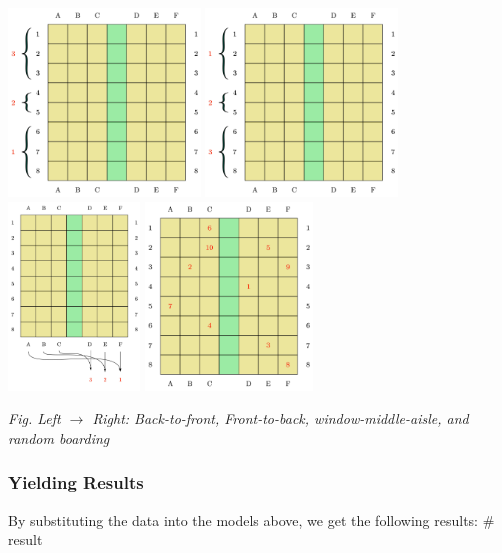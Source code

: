 \documentclass{article}
\theoremstyle{definition}
\theoremstyle{remark}
\numberwithin{equation}{section}
\begin{document}
	\begin{center}
		\includegraphics[height=5cm]{planerow1.jpg}
		\includegraphics[height=5cm]{planerow2.jpg}\\
		\includegraphics[height=5cm]{wdmd.jpg}
		\includegraphics[height=5cm]{planerandom.jpg}

		\small \textit{Fig. Left \(\to\) Right: Back-to-front, Front-to-back, window-middle-aisle, and random boarding}
	\end{center}

	\subsubsection{Yielding Results}
	By substituting the data into the models above, we get the following results:
	\# result
\end{document}
